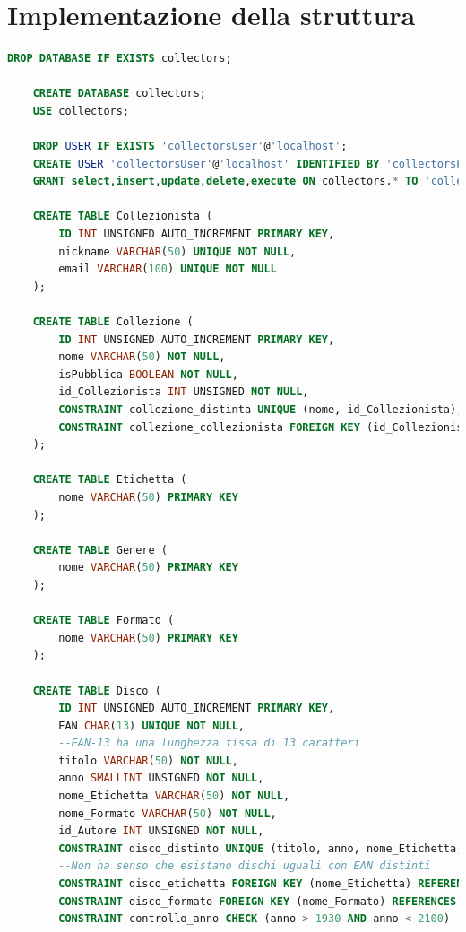 \documentclass{article}
\begin{document}
\pagebreak
\section{Implementazione della struttura}

\begin{lstlisting}[language=SQL]
    DROP DATABASE IF EXISTS collectors;

    CREATE DATABASE collectors;
    USE collectors;

    DROP USER IF EXISTS 'collectorsUser'@'localhost';
    CREATE USER 'collectorsUser'@'localhost' IDENTIFIED BY 'collectorsPwd';
    GRANT select,insert,update,delete,execute ON collectors.* TO 'collectorsUser'@'localhost';

    CREATE TABLE Collezionista (
        ID INT UNSIGNED AUTO_INCREMENT PRIMARY KEY,
        nickname VARCHAR(50) UNIQUE NOT NULL,
        email VARCHAR(100) UNIQUE NOT NULL
    );

    CREATE TABLE Collezione (
        ID INT UNSIGNED AUTO_INCREMENT PRIMARY KEY,
        nome VARCHAR(50) NOT NULL,
        isPubblica BOOLEAN NOT NULL,
        id_Collezionista INT UNSIGNED NOT NULL,
        CONSTRAINT collezione_distinta UNIQUE (nome, id_Collezionista),
        CONSTRAINT collezione_collezionista FOREIGN KEY (id_Collezionista) REFERENCES Collezionista(ID) ON DELETE CASCADE ON UPDATE CASCADE 
    );

    CREATE TABLE Etichetta (
        nome VARCHAR(50) PRIMARY KEY
    );

    CREATE TABLE Genere (
        nome VARCHAR(50) PRIMARY KEY
    );

    CREATE TABLE Formato (
        nome VARCHAR(50) PRIMARY KEY
    );

    CREATE TABLE Disco (
        ID INT UNSIGNED AUTO_INCREMENT PRIMARY KEY,
        EAN CHAR(13) UNIQUE NOT NULL, 
        --EAN-13 ha una lunghezza fissa di 13 caratteri
        titolo VARCHAR(50) NOT NULL,
        anno SMALLINT UNSIGNED NOT NULL,
        nome_Etichetta VARCHAR(50) NOT NULL,
        nome_Formato VARCHAR(50) NOT NULL,
        id_Autore INT UNSIGNED NOT NULL,
        CONSTRAINT disco_distinto UNIQUE (titolo, anno, nome_Etichetta, nome_Formato, id_Autore), 
        --Non ha senso che esistano dischi uguali con EAN distinti
        CONSTRAINT disco_etichetta FOREIGN KEY (nome_Etichetta) REFERENCES Etichetta(nome) ON DELETE NO ACTION ON UPDATE CASCADE,
        CONSTRAINT disco_formato FOREIGN KEY (nome_Formato) REFERENCES Formato(nome) ON DELETE NO ACTION ON UPDATE CASCADE,
        CONSTRAINT controllo_anno CHECK (anno > 1930 AND anno < 2100) 
        

\end{lstlisting}
\end{document}
